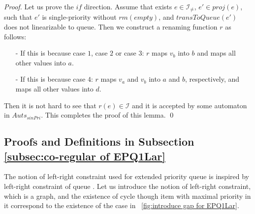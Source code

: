 \begin {proof}
Let us prove the $\textit{if}$ direction. Assume that exists $e \in \mathcal{I}_{\neq}$, $e' \in \textit{proj}(e)$, such that $e'$ is single-priority  without $\textit{rm}(\textit{empty})$, and $\textit{transToQueue}(e')$ does not linearizable to queue. Then we construct a renaming function $r$ as follows:

\begin{itemize}
\setlength{\itemsep}{0.5pt}
\item[-] If this is because case $1$, case $2$ or case $3$: $r$ maps $v_b$ into $b$ and maps all other values into $a$.

\item[-] If this is because case $4$: $r$ maps $v_a$ and $v_b$ into $a$ and $b$, respectively, and maps all other values into $d$.
\end{itemize}

Then it is not hard to see that $r(e) \in \mathcal{I}$ and it is accepted by some automaton in $\textit{Auts}_{\textit{sinPri}}$. This completes the proof of this lemma. \qed
\end {proof}




\subsection{Proofs and Definitions in Subsection \ref{subsec:co-regular of EPQ1Lar}}
\label{sec:appendix proof and definition in section co-regular of EPQ1Lar}


The notion of left-right constraint used for extended priority queue is inspired by left-right constraint of queue \cite{Bouajjani:2015}. Let us introduce the notion of left-right constraint, which is a graph, and the existence of cycle though item with maximal priority in it correspond to the existence of the case in \figurename~\ref{fig:introduce gap for EPQ1Lar}.



